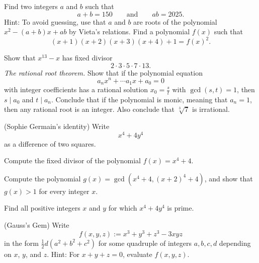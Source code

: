
\exercises

\begin{starter}
  \exercise Find two integers $a$ and $b$ such that
  \begin{equation*}
    a+b=150\qquad\text{and}\qquad ab=2025.
  \end{equation*}
  Hint: To avoid guessing, use that $a$ and $b$ are roots of the polynomial $x^2-(a+b)x+ab$ by Vieta's relations.
  \exercise Find a polynomial $f(x)$ such that
  \begin{equation*}
    (x+1)(x+2)(x+3)(x+4)+1=f(x)^2.
  \end{equation*}
  
\end{starter}

\begin{routine}
  \exercise Show that $x^{13}-x$ has fixed divisor
  \begin{equation*}
    2\cdot 3\cdot 5\cdot 7\cdot 13.
  \end{equation*}
  \exercise \emph{The rational root theorem.} Show that if the polynomial equation
  \begin{equation*}
    a_nx^n+\cdots a_1x+a_0=0
  \end{equation*}
  with integer coefficients has a rational solution $x_0=\frac{s}{t}$ with $\gcd(s,t)=1$, then $s\mid a_0$ and $t\mid a_n$. Conclude that if the polynomial is monic, meaning that $a_n=1$, then any rational root is an integer. Also conclude that $\sqrt[3]{7}$ is irrational.
  \exercise
  \begin{subexenum}
  \item (Sophie Germain's identity) Write
    \begin{equation*}
      x^4+4y^4
    \end{equation*}
    as a difference of two squares.
  \item Compute the fixed divisor of the polynomial $f(x)=x^4+4$.
  \item Compute the polynomial $g(x)=\gcd(x^4+4,(x+2)^4+4)$, and show that $g(x)>1$ for every integer $x$.
  \item Find all positive integers $x$ and $y$ for which $x^4+4y^4$ is prime.
  \end{subexenum}
  \exercise (Gauss's Gem) Write
  \begin{equation*}
    f(x,y,z):=x^3+y^3+z^3-3xyz
  \end{equation*}
  in the form $\frac{1}{2}d(a^2+b^2+c^2)$ for some quadruple of integers $a,b,c,d$ depending on $x$, $y$, and $z$. Hint: For $x+y+z=0$, evaluate $f(x,y,z)$.

\end{routine}
